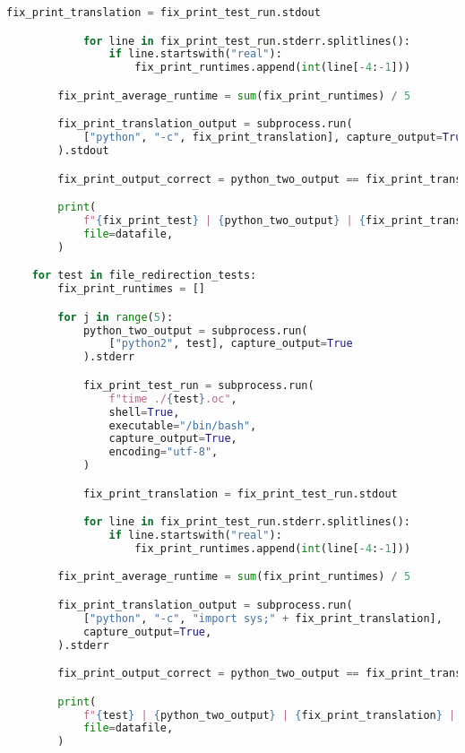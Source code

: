 \begin{lstlisting}[language=Python]
            fix_print_translation = fix_print_test_run.stdout

            for line in fix_print_test_run.stderr.splitlines():
                if line.startswith("real"):
                    fix_print_runtimes.append(int(line[-4:-1]))

        fix_print_average_runtime = sum(fix_print_runtimes) / 5

        fix_print_translation_output = subprocess.run(
            ["python", "-c", fix_print_translation], capture_output=True
        ).stdout

        fix_print_output_correct = python_two_output == fix_print_translation_output

        print(
            f"{fix_print_test} | {python_two_output} | {fix_print_translation} | {fix_print_translation_output} | {fix_print_output_correct} | {fix_print_runtimes[0]} | {fix_print_runtimes[1]} | {fix_print_runtimes[2]} | {fix_print_runtimes[3]} | {fix_print_runtimes[4]} | {fix_print_average_runtime}",
            file=datafile,
        )

    for test in file_redirection_tests:
        fix_print_runtimes = []

        for j in range(5):
            python_two_output = subprocess.run(
                ["python2", test], capture_output=True
            ).stderr

            fix_print_test_run = subprocess.run(
                f"time ./{test}.oc",
                shell=True,
                executable="/bin/bash",
                capture_output=True,
                encoding="utf-8",
            )

            fix_print_translation = fix_print_test_run.stdout

            for line in fix_print_test_run.stderr.splitlines():
                if line.startswith("real"):
                    fix_print_runtimes.append(int(line[-4:-1]))

        fix_print_average_runtime = sum(fix_print_runtimes) / 5

        fix_print_translation_output = subprocess.run(
            ["python", "-c", "import sys;" + fix_print_translation],
            capture_output=True,
        ).stderr

        fix_print_output_correct = python_two_output == fix_print_translation_output

        print(
            f"{test} | {python_two_output} | {fix_print_translation} | {fix_print_translation_output} | {fix_print_output_correct} | {fix_print_runtimes[0]} | {fix_print_runtimes[1]} | {fix_print_runtimes[2]} | {fix_print_runtimes[3]} | {fix_print_runtimes[4]} | {fix_print_average_runtime}",
            file=datafile,
        )
\end{lstlisting}